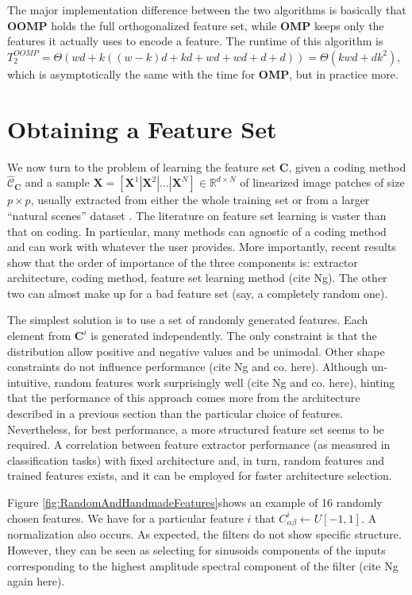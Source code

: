 \documentclass[12pt,a4paper,oneside,english]{UPBThesis}
\newcommand{\hctimes}[2]{{#1}\!\times\!{#2}}
\begin{document}
The major implementation difference between the two algorithms is basically that \textbf{OOMP} holds the full orthogonalized feature set, while \textbf{OMP} keeps only the features it actually uses to encode a feature. The runtime of this algorithm is $T_2^{OOMP} = \Theta(wd + k((w-k)d + kd + wd + wd + d + d)) = \Theta(kwd + dk^2)$, which is asymptotically the same with the time for \textbf{OMP}, but in practice more.

\chapter{Obtaining a Feature Set}

We now turn to the problem of learning the feature set $\textbf{C}$, given a coding method $\hat{\mathcal{C}}_\textbf{C}$ and a sample $\textbf{X} = \left[ \textbf{X}^1 \left|\right. \textbf{X}^2 \left|\right. \dots \left|\right. \textbf{X}^N \right] \in \mathbb{R}^{\hctimes{d}{N}}$ of linearized image patches of size $\hctimes{p}{p}$, usually extracted from either the whole training set or from a larger ``natural scenes'' dataset \cite{self-taught-learning}. The literature on feature set learning is vaster than that on coding. In particular, many methods can agnostic of a coding method and can work with whatever the user provides. More importantly, recent results show that the order of importance of the three components is: extractor architecture, coding method, feature set learning method (cite Ng). The other two can almost make up for a bad feature set (say, a completely random one).

The simplest solution is to use a set of randomly generated features. Each element from $\textbf{C}^i$ is generated independently. The only constraint is that the distribution allow positive and negative values and be unimodal. Other shape constraints do not influence performance (cite Ng and co. here). Although un-intuitive, random features work surprisingly well (cite Ng and co. here), hinting that the performance of this approach comes more from the architecture described in a previous section than the particular choice of features. Nevertheless, for best performance, a more structured feature set seems to be required. A correlation between feature extractor performance (as measured in classification tasks) with fixed architecture and, in turn, random features and trained features exists, and it can be employed for faster architecture selection.

Figure \ref{fig:RandomAndHandmadeFeatures}shows an example of 16 randomly chosen features. We have for a particular feature $i$ that $C^i_{\alpha\beta} \leftarrow U[-1,1]$. A normalization also occurs. As expected, the filters do not show specific structure. However, they can be seen as selecting for sinusoids components of the inputs corresponding to the highest amplitude spectral component of the filter (cite Ng again here).
\end{document}
